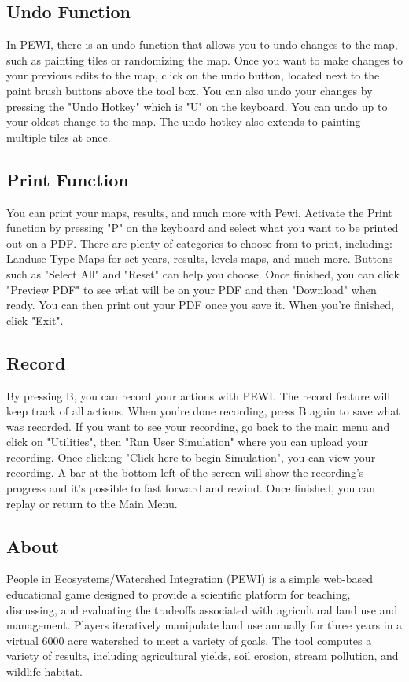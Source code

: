 \documentclass[11pt]{article}
\begin{document}
\begin{itemize}
\subsection{Undo Function}
In PEWI, there is an undo function that allows you to undo changes to the map, such as painting tiles or randomizing the map. Once you want to make changes to your previous edits to the map, click on the undo button, located next to the paint brush buttons above the tool box. You can also undo your changes by pressing the "Undo Hotkey" which is "U" on the keyboard. You can undo up to your oldest change to the map. The undo hotkey also extends to painting multiple tiles at once. 

\subsection{Print Function}
You can print your maps, results, and much more with Pewi. Activate the Print function by pressing "P" on the keyboard and select what you want to be printed out on a PDF. There are plenty of categories to choose from to print, including: Landuse Type Maps for set years, results, levels maps, and much more. Buttons such as "Select All" and "Reset" can help you choose. Once finished, you can click "Preview PDF" to see what will be on your PDF and then "Download" when ready. You can then print out your PDF once you save it. When you're finished, click "Exit". 

\subsection{Record}
By pressing B, you can record your actions with PEWI. The record feature will keep track of all actions. When you're done recording, press B again to save what was recorded. If you want to see your recording, go back to the main menu and click on "Utilities", then "Run User Simulation" where you can upload your recording. Once clicking "Click here to begin Simulation", you can view your recording. A bar at the bottom left of the screen will show the recording's progress and it's possible to fast forward and rewind. Once finished, you can replay or return to the Main Menu. 

\subsection{About}
People in Ecosystems/Watershed Integration (PEWI) is a simple web-based educational game designed to provide a scientific platform for teaching, discussing, and evaluating the tradeoffs associated with agricultural land use and management. Players iteratively manipulate land use annually for three years in a virtual 6000 acre watershed to meet a variety of goals. The tool computes a variety of results, including agricultural yields, soil erosion, stream pollution, and wildlife habitat.


\end{itemize}
\end{document}
